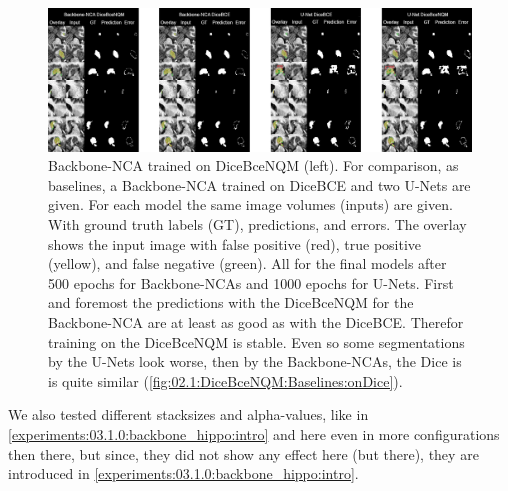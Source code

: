 \begin{figure}[h!]
    \vspace{0.5cm}
    \centering
        \includegraphics[width=\linewidth]{Graphics/Experiments/2.1_BaselineComparison.png}
        \caption{Backbone-NCA trained on DiceBceNQM (left). For comparison, as baselines, a Backbone-NCA trained on DiceBCE and two U-Nets are given. For each model the same image volumes (inputs) are given. With ground truth labels (GT), predictions, and errors. The overlay shows the input image with false positive (red), true positive (yellow), and  false negative (green). All for the final models after 500 epochs for Backbone-NCAs and 1000 epochs for U-Nets. First and foremost the predictions with the DiceBceNQM for the Backbone-NCA are at least as good as with the DiceBCE. Therefor training on the DiceBceNQM is stable. Even so some segmentations by the U-Nets look worse, then by the Backbone-NCAs, the Dice is is quite similar (\autoref{fig:02.1:DiceBceNQM:Baselines:onDice}).}
    \label{fig:02.1:DiceBceNQM:Baselines:Segmentations}
\end{figure}


We also tested different stacksizes and alpha-values, like in \autoref{experiments:03.1.0:backbone_hippo:intro} and here even in more configurations then there, but since, they did not show any effect here (but there), they are introduced in \autoref{experiments:03.1.0:backbone_hippo:intro}.